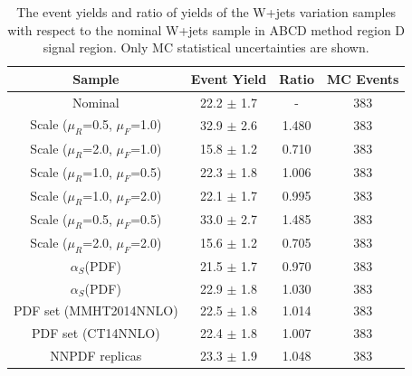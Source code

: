 %
%
\begin{table}[htbp!]
\begin{center}
\begin{tabular}{c|c|c||c}
Sample     & Event Yield & Ratio & MC Events \\ 
\hline
Nominal                              &  22.2 $\pm$ 1.7 & -      & 383 \\
Scale ($\mu_{R}$=0.5, $\mu_{F}$=1.0) &  32.9 $\pm$ 2.6 & 1.480  & 383 \\
Scale ($\mu_{R}$=2.0, $\mu_{F}$=1.0) &  15.8 $\pm$ 1.2 & 0.710  & 383 \\
Scale ($\mu_{R}$=1.0, $\mu_{F}$=0.5) &  22.3 $\pm$ 1.8 & 1.006  & 383 \\
Scale ($\mu_{R}$=1.0, $\mu_{F}$=2.0) &  22.1 $\pm$ 1.7 & 0.995  & 383 \\
Scale ($\mu_{R}$=0.5, $\mu_{F}$=0.5) &  33.0 $\pm$ 2.7 & 1.485  & 383 \\
Scale ($\mu_{R}$=2.0, $\mu_{F}$=2.0) &  15.6 $\pm$ 1.2 & 0.705  & 383 \\
$\alpha_{S}$(PDF)                    &  21.5 $\pm$ 1.7 & 0.970  & 383 \\
$\alpha_{S}$(PDF)                    &  22.9 $\pm$ 1.8 & 1.030  & 383 \\
PDF set (MMHT2014NNLO)               &  22.5 $\pm$ 1.8 & 1.014  & 383 \\
PDF set (CT14NNLO)                   &  22.4 $\pm$ 1.8 & 1.007  & 383 \\
NNPDF replicas                       &  23.3 $\pm$ 1.9 & 1.048  & 383 \\
\end{tabular}
\end{center}
\caption{The event yields and ratio of yields of the W+jets variation samples
with respect to the nominal W+jets sample in ABCD method region D signal region. 
Only MC statistical uncertainties are shown.} 
\label{tab:boosted_qcd_region_d_systematics_wjets_yields}
\end{table}
%
%
